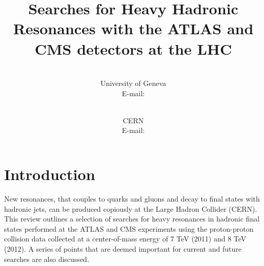 \documentclass{PoS}
\title{Searches for Heavy Hadronic Resonances with the ATLAS and CMS detectors at the LHC}
\author{\speaker{Caterina Doglioni}\\%
        University of Geneva\\
        E-mail: \email{caterina.doglioni@cern.ch}}
\author{\speaker{Francesco Santanastasio}\\
       CERN\\
       E-mail: \email{francesco.santanastasio@cern.ch}}
\newcommand{\antikt}{anti-$k_t$}
\begin{document}
\section{Introduction}
New resonances, that couples to quarks and gluons and decay to final states with hadronic jets, 
can be produced copiously at the Large Hadron Collider (CERN). 
This review outlines a selection of searches for heavy resonances in hadronic final states 
performed at the ATLAS and CMS experiments using the proton-proton collision data collected 
at a center-of-mass energy of 7 TeV (2011) and 8 TeV (2012). A series of points that 
are deemed important for current and future searches are also discussed.



\end{document}
